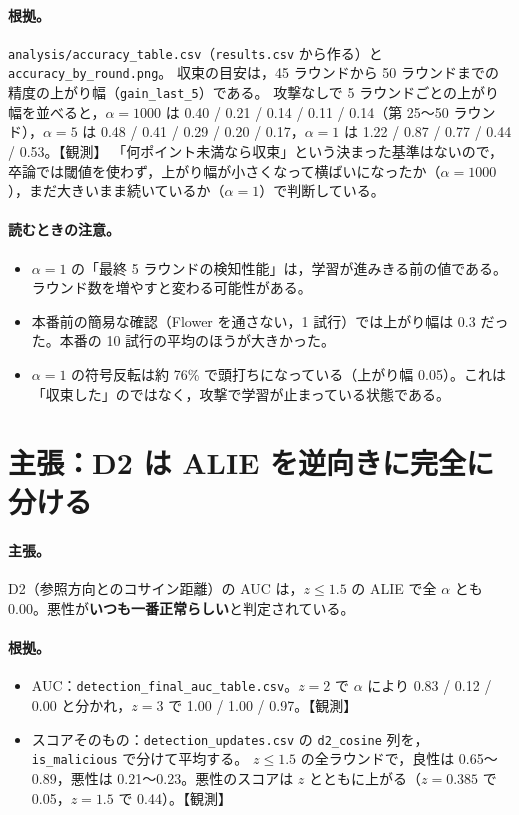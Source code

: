 \documentclass[a4j, dvipdfmx]{jsarticle}  %
\begin{document}
\paragraph{根拠。}
\texttt{analysis/accuracy\_table.csv}（\texttt{results.csv} から作る）と \texttt{accuracy\_by\_round.png}。
収束の目安は，45 ラウンドから 50 ラウンドまでの精度の上がり幅（\texttt{gain\_last\_5}）である。
攻撃なしで 5 ラウンドごとの上がり幅を並べると，$\alpha = 1000$ は 0.40 / 0.21 / 0.14 / 0.11 / 0.14（第 25〜50 ラウンド），$\alpha = 5$ は 0.48 / 0.41 / 0.29 / 0.20 / 0.17，$\alpha = 1$ は 1.22 / 0.87 / 0.77 / 0.44 / 0.53。【観測】
「何ポイント未満なら収束」という決まった基準はないので，卒論では閾値を使わず，上がり幅が小さくなって横ばいになったか（$\alpha = 1000$），まだ大きいまま続いているか（$\alpha = 1$）で判断している。

\paragraph{読むときの注意。}
\begin{itemize}
  \item $\alpha = 1$ の「最終 5 ラウンドの検知性能」は，学習が進みきる前の値である。ラウンド数を増やすと変わる可能性がある。
  \item 本番前の簡易な確認（Flower を通さない，1 試行）では上がり幅は 0.3 だった。本番の 10 試行の平均のほうが大きかった。
  \item $\alpha = 1$ の符号反転は約 76\% で頭打ちになっている（上がり幅 0.05）。これは「収束した」のではなく，攻撃で学習が止まっている状態である。
\end{itemize}

\section{主張：D2 は ALIE を逆向きに完全に分ける}
\label{sec:claim-d2}

\paragraph{主張。}
D2（参照方向とのコサイン距離）の AUC は，$z \le 1.5$ の ALIE で全 $\alpha$ とも 0.00。悪性が\textbf{いつも一番正常らしい}と判定されている。

\paragraph{根拠。}
\begin{itemize}
  \item AUC：\texttt{detection\_final\_auc\_table.csv}。$z = 2$ で $\alpha$ により 0.83 / 0.12 / 0.00 と分かれ，$z = 3$ で 1.00 / 1.00 / 0.97。【観測】
  \item スコアそのもの：\texttt{detection\_updates.csv} の \texttt{d2\_cosine} 列を，\texttt{is\_malicious} で分けて平均する。
        $z \le 1.5$ の全ラウンドで，良性は 0.65〜0.89，悪性は 0.21〜0.23。悪性のスコアは $z$ とともに上がる（$z = 0.385$ で 0.05，$z = 1.5$ で 0.44）。【観測】
\end{itemize}
\end{document}
